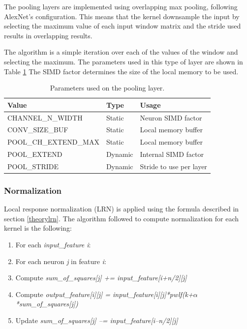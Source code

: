 \begin{enumerate}
The pooling layers are implemented using overlapping max pooling, following AlexNet's
configuration. This means that the kernel downsample the input by selecting the maximum
value of each input window matrix and the stride used results in overlapping results.

The algorithm is a simple iteration over each of the values of the window and selecting
the maximum. The parameters used in this type of layer are shown in Table \ref{tab:poolinglayer}
The SIMD factor determines the size of the local memory to be used.

\begin{table}[H]
    \begin{center}
        \caption{Parameters used on the pooling layer.}
        \begin{tabular}{lll}
        \hline
        Value                 & Type    & Usage                   \\ \hline
        CHANNEL\_N\_WIDTH     & Static  & Neuron SIMD factor      \\
        CONV\_SIZE\_BUF       & Static  & Local memory buffer     \\
        POOL\_CH\_EXTEND\_MAX & Static  & Local memory buffer     \\
        POOL\_EXTEND          & Dynamic & Internal SIMD factor    \\
        POOL\_STRIDE          & Dynamic & Stride to use per layer \\ \hline
        \end{tabular}
        \label{tab:poolinglayer}
    \end{center}
\end{table}

\subsubsection{Normalization}

Local response normalization (LRN) is applied using the formula described in
section \ref{theorylrn}. The algorithm followed to compute normalization for
each kernel is the following:

\begin{enumerate}
    \item For each \textit{input\_feature i}:
    \item For each neuron \textit{j} in feature \textit{i}:
    \item Compute \textit{sum\_of\_squares[j] += input\_feature[i+n/2][j]}
    \item Compute \textit{output\_feature[i][j] = input\_feature[i][j]*pwlf(k+$\alpha$*sum\_of\_squares[j])}
    \item Update \textit{sum\_of\_squares[j] –= input\_feature[i–n/2][j]}
\end{enumerate}


\end{enumerate}
